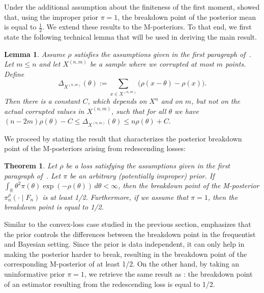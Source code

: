 \documentclass[11pt, oneside]{amsart}
\newtheorem{theorem}{Theorem}[]
\newtheorem{lemma}{Lemma}
\theoremstyle{definition}   %
\newcommand{\R}{\mathbb{R}}
\newcommand{\loss}{\rho}
\newcommand{\mposterior}{\pi_n^{\loss}}
\newcommand{\corruptedsample}{X^{(n,m)}}
\begin{document}
%
Under the additional assumption about the finiteness of the first moment,
\cite{huber1984} showed that, using the improper prior \( \pi = 1\), the breakdown point of the posterior mean is equal to \( \frac{1}{2}. \) We extend these results to the M-posteriors. To that end, we first state the following technical lemma that will be used in deriving the main result.
%
\begin{lemma}
\label{lemma::huber-paper-redescending-loss}
    Assume \( \loss \) satisfies the assumptions given in the first paragraph of~. Let \( m \leq n\) and let \(\corruptedsample\) be a sample where we corrupted at most $m$ points. Define
    \[
        \Delta_{\corruptedsample} (\theta) := \sum_{x \in \corruptedsample} \bigl ( \loss (x - \theta) - \loss (x) \bigr ).
    \]
    Then there is a constant \(C\), which depends on \(X^n\) and on \(m\), but not on the actual corrupted values in \( \corruptedsample\), such that for all \( \theta\) we have
    $(n - 2m) \rho (\theta) - C \leq \Delta_{\corruptedsample} (\theta) \leq n \rho(\theta) + C.$
\end{lemma}
%

We proceed by stating the result that characterizes the posterior breakdown point of the M-posteriors arising from redescending losses:
%
\begin{theorem}
\label{thm::breakdown-point-redescending-loss}
    Let \( \loss \) be a loss satisfying the assumptions given in the first paragraph of~. 
    Let \( \pi \) be an arbitrary (potentially improper) prior. If \( \int_\R  \theta^2 \pi(\theta) \exp (- \loss(\theta) )  \, d\theta < \infty \), then the breakdown point of the M-posterior \( \mposterior(\cdot \mid F_n) \) is at least 1/2. Furthermore, if we assume that \( \pi = 1\), then the breakdown point is equal to 1/2.
\end{theorem}

Similar to the convex-loss case studied in the previous section,  emphasizes that the prior controls the differences between the breakdown point in the frequentist and Bayesian setting. Since the prior is data independent, it can only help in making the posterior harder to break, resulting in the breakdown point of the corresponding M-posterior of at least 1/2. On the other hand, by taking an uninformative prior \( \pi = 1\), we retrieve the same result as \cite{huber1984}: the breakdown point of an estimator resulting from the redescending loss is equal to 1/2. 
%
\end{document}
